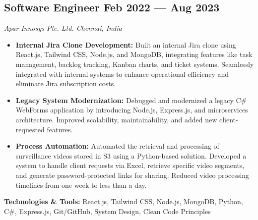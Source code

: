 \documentclass[a4paper,10pt]{article}
\newenvironment{zitemize}{
  \begin{itemize} 
    \itemsep 0pt 
    \parskip 0pt 
    \parsep 1pt
    \topsep 0pt 
    \partopsep 0pt
    \sloppy
}{
  \end{itemize}
  \vspace{0.5em} %
}
\begin{document}
\subsection*{Software Engineer \hfill Feb 2022 --- Aug 2023}
\textit{Apar Innosys Pte. Ltd. \hfill Chennai, India}
\begin{zitemize}
    \item \textbf{Internal Jira Clone Development:} Built an internal Jira clone using React.js, Tailwind CSS, Node.js, and MongoDB, integrating features like task management, backlog tracking, Kanban charts, and ticket systems. Seamlessly integrated with internal systems to enhance operational efficiency and eliminate Jira subscription costs.
    \item \textbf{Legacy System Modernization:} Debugged and modernized a legacy C\# WebForms application by introducing Node.js, Express.js, and microservices architecture. Improved scalability, maintainability, and added new client-requested features.
    \item \textbf{Process Automation:} Automated the retrieval and processing of surveillance videos stored in S3 using a Python-based solution. Developed a system to handle client requests via Excel, retrieve specific video segments, and generate password-protected links for sharing. Reduced video processing timelines from one week to less than a day.
\end{zitemize}
\textbf{Technologies \& Tools:} React.js, Tailwind CSS, Node.js, MongoDB, Python, C\#, Express.js, Git/GitHub, System Design, Clean Code Principles

\pagebreak
\pagestyle{fancy}
\fancyhf{}

\vspace{6pt}
\end{document}
